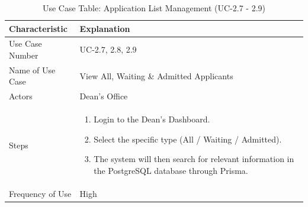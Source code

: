 \begin{table}[H]
    \centering
    \small
    \renewcommand{\arraystretch}{1.4}
    \caption{Use Case Table: Application List Management (UC-2.7 - 2.9)}
    \label{tab:app_list_management}
    
    \begin{tabularx}{\textwidth}{|l|X|}
        \hline
        \rowcolor[gray]{0.9} {Characteristic} & {Explanation} \\ \hline
        Use Case Number & UC-2.7, 2.8, 2.9 \\ \hline
        Name of Use Case & View All, Waiting \& Admitted Applicants \\ \hline
        Actors & Dean’s Office \\ \hline
        Steps & 
        \begin{enumerate}[nosep, leftmargin=*]
            \item Login to the Dean’s Dashboard.
            \item Select the specific type (All / Waiting / Admitted).
            \item The system will then search for relevant information in the PostgreSQL database through Prisma.
        \end{enumerate} \\ \hline
        Frequency of Use & High \\ \hline
    \end{tabularx}
\end{table}
\FloatBarrier